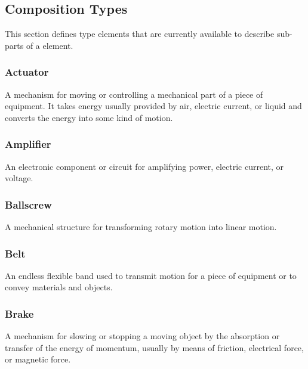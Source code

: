 \subsection{Composition Types} \label{sec:Composition Types}


This section defines  type elements that are currently available to describe sub-parts of a  element.


\subsubsection{Actuator}




A mechanism for moving or controlling a mechanical part of a piece of equipment.   
 It takes energy usually provided by air, electric current, or liquid and converts the energy into some kind of motion. 


\subsubsection{Amplifier}
\label{sec:Amplifier}



An electronic component or circuit for amplifying power, electric current, or voltage.


\subsubsection{Ballscrew}
\label{sec:Ballscrew}



A mechanical structure for transforming rotary motion into linear motion.


\subsubsection{Belt}
\label{sec:Belt}



An endless flexible band used to transmit motion for a piece of equipment or to convey materials and objects.


\subsubsection{Brake}
\label{sec:Brake}



A mechanism for slowing or stopping a moving object by the absorption or transfer of the energy of momentum, usually by means of friction, electrical force, or magnetic force.


